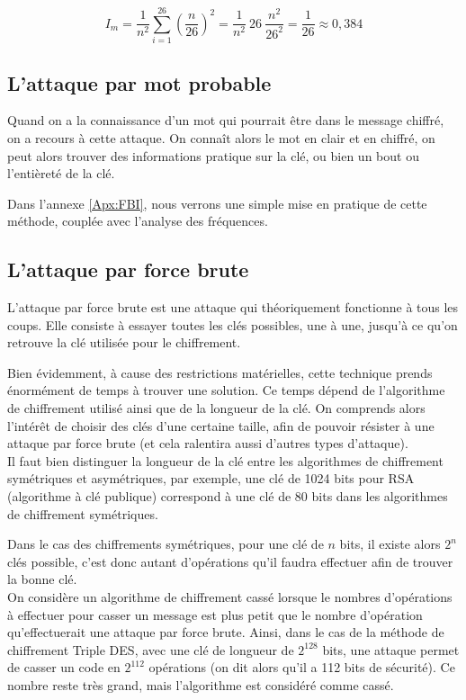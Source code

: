 \[I_m = \dfrac{1}{n^2} \sum_{i = 1}^{26} \left(\dfrac{n}{26}\right)^2 =
\dfrac{1}{n^2} ~26~ \dfrac{n^2}{26^2} = \dfrac{1}{26} \approx
0,384\] 

\subsection{L'attaque par mot probable\label{sec:MotProbable}}
Quand on a la connaissance d'un mot qui pourrait être dans le
message chiffré, on a recours à cette attaque. On connaît alors le
mot en clair et en chiffré, on peut alors trouver des informations
pratique sur la clé, ou bien un bout ou l'entièreté de la clé.

Dans l'annexe \ref{Apx:FBI}, nous verrons une simple mise en pratique
de cette méthode, couplée avec l'analyse des fréquences.

\subsection{L'attaque par force brute}
L'attaque par force brute est une attaque qui théoriquement
fonctionne à tous les coups. Elle consiste à essayer toutes les
clés possibles, une à une, jusqu'à ce qu'on retrouve
la clé utilisée pour le chiffrement.

Bien évidemment, à cause des restrictions matérielles, cette
technique prends énormément de temps à trouver une solution. Ce
temps dépend de l'algorithme de chiffrement utilisé ainsi que de
la longueur de la clé. On comprends alors l'intérêt de choisir des
clés d'une certaine taille, afin de pouvoir résister à une attaque
par force brute (et cela ralentira aussi d'autres types
d'attaque).
\\

Il faut bien distinguer la longueur de la clé entre les
algorithmes de chiffrement symétriques et asymétriques, par
exemple, une clé de 1024 bits pour RSA (algorithme à clé
publique) correspond à une clé de 80 bits dans les algorithmes de
chiffrement symétriques. 

Dans le cas des chiffrements symétriques, pour une clé de $n$
bits, il existe alors $2^n$ clés possible, c'est donc autant
d'opérations qu'il faudra effectuer afin de trouver la bonne clé. 
\\

On considère un algorithme de chiffrement cassé lorsque le nombres
d'opérations à effectuer pour casser un message est plus
petit que le nombre d'opération qu'effectuerait une attaque par
force brute. Ainsi, dans le cas de la méthode de chiffrement
Triple DES, avec une clé de longueur de $2^{128}$ bits, une
attaque permet de casser un code en $2^{112}$ opérations (on dit
alors qu'il a 112 bits de sécurité). Ce nombre
reste très grand, mais l'algorithme est considéré comme cassé.
\\

